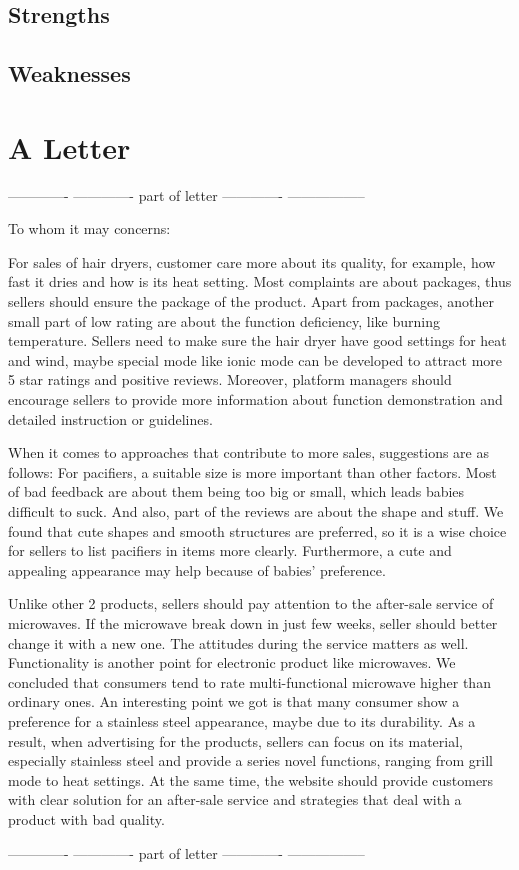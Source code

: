 \documentclass{mcmthesis}
\begin{document}
\subsection{Strengths}



\subsection{Weaknesses}


\section{A Letter}
------------- -------------  part of letter -------------  -----------------\par
To whom it may concerns:\par

For sales of hair dryers, customer care more about its quality, for example, how fast it dries and how is its heat setting. Most complaints are about packages, thus sellers should ensure the package of the product. Apart from packages, another small part of low rating are about the function deficiency, like burning temperature. Sellers need to make sure the hair dryer have good settings for heat and wind, maybe special mode like ionic mode can be developed to attract more 5 star ratings and positive reviews. Moreover, platform managers should encourage sellers to provide more information about function demonstration and detailed instruction or guidelines.\par
 
When it comes to approaches that contribute to more sales, suggestions are as follows:
For pacifiers, a suitable size is more important than other factors. Most of bad feedback are about them being too big or small, which leads babies difficult to suck. And also, part of the reviews are about the shape and stuff. We found that cute shapes and smooth structures are preferred, so it is a wise choice for sellers to list pacifiers in items more clearly. Furthermore, a cute and appealing appearance may help because of babies’ preference.\par

Unlike other 2 products, sellers should pay attention to the after-sale service of microwaves. If the microwave break down in just few weeks, seller should better change it with a new one. The attitudes during the service matters as well. Functionality is another point for electronic product like microwaves. We concluded that consumers tend to rate multi-functional microwave higher than ordinary ones. An interesting point we got is that many consumer show a preference for a stainless steel appearance, maybe due to its durability. As a result, when advertising for the products, sellers can focus on its material, especially stainless steel and provide a series novel functions, ranging from grill mode to heat settings. At the same time, the website should provide customers with clear solution for an after-sale service and strategies that deal with a product with bad quality.\par
------------- -------------  part of letter -------------  -----------------\par
\end{document}
